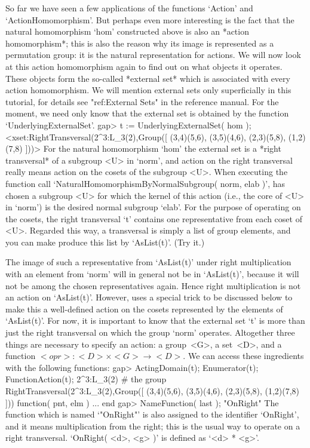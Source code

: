  
So far we have seen  a few applications  of the functions `Action' and
`ActionHomomorphism'. But perhaps even  more  interesting is the  fact
that  the  natural  homomorphism `hom'   constructed  above  is  also  an
*action  homomorphism*;  this  is also  the  reason  why its image  is
represented as a permutation group:  it is the natural representation for
actions. We will now look at this action homomorphism again to find
out on what   objects it  operates.  These  objects  form the   so-called
*external set* which is  associated with every action homomorphism. We
will  mention  external sets  only   superficially in this  tutorial, for
details see "ref:External Sets" in the  reference manual. For the moment,
we need   only know that   the external set is  obtained  by the function
`UnderlyingExternalSet'.
\beginexample
gap> t := UnderlyingExternalSet( hom );
<xset:RightTransversal(2^3:L_3(2),Group([ (3,4)(5,6), (3,5)(4,6), (2,3)(5,8), 
  (1,2)(7,8) ]))>
\endexample
{}
For  the   natural homomorphism   `hom' the  external   set  is a  *right
transversal* of a subgroup  <U>   in `norm',  and   action on the   right
transversal really means action  on the cosets  of the subgroup <U>. When
executing  the function  call `NaturalHomomorphismByNormalSubgroup( norm,
elab )', {\GAP} has  chosen a subgroup  <U> for which  the kernel of this
action (i.e., the core of  <U> in `norm')  is the desired normal subgroup
`elab'. For the purpose of operating on the cosets, the right transversal
`t' contains  one representative  from each coset  of <U>.  Regarded this
way, a transversal  is simply a list of  group elements, and you can make
{\GAP} produce this list by `AsList(t)'. (Try it.)

The  image of  such   a   representative from  `AsList(t)' under    right
multiplication with an  element  from `norm'  will in general  not be  in
`AsList(t)',  because it will   not  be among the  chosen representatives
again.   Hence right multiplication is not   an action on `AsList(t)'.
However, {\GAP} uses a special trick to be discussed below to make this a
well-defined  action  on the  cosets   represented by the  elements of
`AsList(t)'. For now, it is important  to know that  the external set `t'
is   more  than just the  right  transversal  on  which  the group `norm'
operates. Altogether three things  are necessary to specify an action:
a  group~<G>, a  set~<D>, and a   function $<opr>\colon <D>\times  <G>\to
<D>$. We can access these ingredients with the following functions:
\beginexample
gap> ActingDomain(t); Enumerator(t); FunctionAction(t);
2^3:L_3(2) # the group
RightTransversal(2^3:L_3(2),Group([ (3,4)(5,6), (3,5)(4,6), (2,3)(5,8), 
  (1,2)(7,8) ]))
function( pnt, elm ) ... end
gap> NameFunction( last );
"OnRight"
\endexample
The function  which   is  named  `"OnRight"'  is  also   assigned to  the
identifier `OnRight', and it means multiplication from the right; this is
the usual way to operate on a right transversal. `OnRight( <d>, <g> )' is
defined as `<d> * <g>'.

